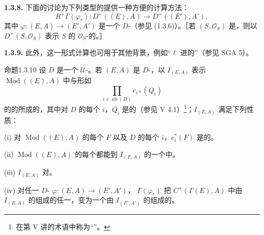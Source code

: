 \textbf{1.3.8.} 下面的讨论为下列类型的提供一种方便的计算方法：
\[
R^+\Gamma(\varphi_*):D^+((E),A)\longrightarrow D^+((E'),A'),
\]
其中 $\varphi:(E,A)\to(E',A')$ 是一个 $D$-（参见 (1.3.6)）。［若 $(S,\mathcal O_S)$ 是，则以 $D^+(S,\mathcal O_S)$ 表示 $S$ 的 $\mathcal O_S$-的。］

\textbf{1.3.9.} 此外，这一形式计算也可用于其他背景，例如“$\ell$ 进的”（参见 SGA 5）。

\begin{SGAresult}{命题}{1.3.10}
设 $D$ 是一个 $\mathcal U$-。若 $(E,A)$ 是 $D$-，以 $I_{(E,A)}$ 表示 $\operatorname{Mod}((E),A)$ 中与形如
\[
\prod_{i\in\operatorname{ob}(D)}e_{i*}(Q_i)
\]
的的所成的，其中对 $D$ 的每个 $i$，$Q_i$ 是的（参见 V 4.1）\footnote{在第 V 讲的术语中称为“”。}；$I_{(E,A)}$ 满足下列性质：

(i) 对 $\operatorname{Mod}((E),A)$ 的每个 $F$ 以及 $D$ 的每个 $i$，$e_i^*(F)$ 是的。

(ii) $\operatorname{Mod}((E),A)$ 的每个都能到 $I_{(E,A)}$ 的一个中。

(iii) $I_{(E,A)}$ 对。

(iv) 对任一 $D$- $\varphi:(E,A)\to(E',A')$， $\Gamma(\varphi_*)$ 把 $C^+(\Gamma(E),A)$ 中由 $I_{(E,A)}$ 的组成的任一，变为一个由 $I_{(E',A')}$ 的组成的。
\end{SGAresult}
